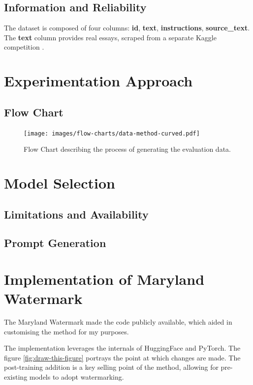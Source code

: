 \documentclass{l4proj}
\theoremstyle{definition}
\begin{document}
    \subsection{Information and Reliability}
        The dataset is composed of four columns: \textbf{id}, \textbf{text}, \textbf{instructions}, \textbf{source\_text}.
        The \textbf{text} column provides real essays, scraped from a separate Kaggle competition \cite{link feedback prize 3 kaggle}.

\section{Experimentation Approach}
    \subsection{Flow Chart}
        \begin{figure}[h]
            \centering
            \texttt{[image: images/flow-charts/data-method-curved.pdf]}
            \caption{Flow Chart describing the process of generating the evaluation data.}
            \label{fig:method-flow-chart} 
        \end{figure}

\section{Model Selection}
    \subsection{Limitations and Availability}
    \subsection{Prompt Generation}
    
\section{Implementation of Maryland Watermark}
    The Maryland Watermark \citep{kirchenbauer2023watermark} made the code publicly available, which aided in customising the method for my purposes.

    The implementation leverages the internals of HuggingFace and PyTorch. The figure \ref{fig:draw-this-figure} portrays the point at which changes are made. The post-training addition is a key selling point of the method, allowing for pre-existing models to adopt watermarking.
\end{document}
